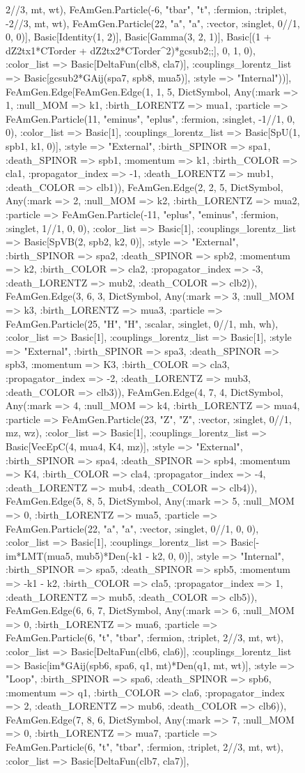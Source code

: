 \documentclass{revtex4}
\begin{document}
\begin{figure}[!htb]
\begin{center}
{2//3, mt, wt), FeAmGen.Particle(-6, "tbar", "t", :fermion, :triplet, -2//3, mt, wt), FeAmGen.Particle(22, "a", "a", :vector, :singlet, 0//1, 0, 0)], Basic[Identity(1, 2)], Basic[Gamma(3, 2, 1)], Basic[(1 + dZ2tx1*CTorder + dZ2tx2*CTorder^2)*gcsub2;;], 0, 1, 0), :color_list => Basic[DeltaFun(clb8, cla7)], :couplings_lorentz_list => Basic[gcsub2*GAij(spa7, spb8, mua5)], :style => "Internal"))], FeAmGen.Edge[FeAmGen.Edge(1, 1, 5, Dict{Symbol, Any}(:mark => 1, :null_MOM => k1, :birth_LORENTZ => mua1, :particle => FeAmGen.Particle(11, "eminus", "eplus", :fermion, :singlet, -1//1, 0, 0), :color_list => Basic[1], :couplings_lorentz_list => Basic[SpU(1, spb1, k1, 0)], :style => "External", :birth_SPINOR => spa1, :death_SPINOR => spb1, :momentum => k1, :birth_COLOR => cla1, :propagator_index => -1, :death_LORENTZ => mub1, :death_COLOR => clb1)), FeAmGen.Edge(2, 2, 5, Dict{Symbol, Any}(:mark => 2, :null_MOM => k2, :birth_LORENTZ => mua2, :particle => FeAmGen.Particle(-11, "eplus", "eminus", :fermion, :singlet, 1//1, 0, 0), :color_list => Basic[1], :couplings_lorentz_list => Basic[SpVB(2, spb2, k2, 0)], :style => "External", :birth_SPINOR => spa2, :death_SPINOR => spb2, :momentum => k2, :birth_COLOR => cla2, :propagator_index => -3, :death_LORENTZ => mub2, :death_COLOR => clb2)), FeAmGen.Edge(3, 6, 3, Dict{Symbol, Any}(:mark => 3, :null_MOM => k3, :birth_LORENTZ => mua3, :particle => FeAmGen.Particle(25, "H", "H", :scalar, :singlet, 0//1, mh, wh), :color_list => Basic[1], :couplings_lorentz_list => Basic[1], :style => "External", :birth_SPINOR => spa3, :death_SPINOR => spb3, :momentum => K3, :birth_COLOR => cla3, :propagator_index => -2, :death_LORENTZ => mub3, :death_COLOR => clb3)), FeAmGen.Edge(4, 7, 4, Dict{Symbol, Any}(:mark => 4, :null_MOM => k4, :birth_LORENTZ => mua4, :particle => FeAmGen.Particle(23, "Z", "Z", :vector, :singlet, 0//1, mz, wz), :color_list => Basic[1], :couplings_lorentz_list => Basic[VecEpC(4, mua4, K4, mz)], :style => "External", :birth_SPINOR => spa4, :death_SPINOR => spb4, :momentum => K4, :birth_COLOR => cla4, :propagator_index => -4, :death_LORENTZ => mub4, :death_COLOR => clb4)), FeAmGen.Edge(5, 8, 5, Dict{Symbol, Any}(:mark => 5, :null_MOM => 0, :birth_LORENTZ => mua5, :particle => FeAmGen.Particle(22, "a", "a", :vector, :singlet, 0//1, 0, 0), :color_list => Basic[1], :couplings_lorentz_list => Basic[-im*LMT(mua5, mub5)*Den(-k1 - k2, 0, 0)], :style => "Internal", :birth_SPINOR => spa5, :death_SPINOR => spb5, :momentum => -k1 - k2, :birth_COLOR => cla5, :propagator_index => 1, :death_LORENTZ => mub5, :death_COLOR => clb5)), FeAmGen.Edge(6, 6, 7, Dict{Symbol, Any}(:mark => 6, :null_MOM => 0, :birth_LORENTZ => mua6, :particle => FeAmGen.Particle(6, "t", "tbar", :fermion, :triplet, 2//3, mt, wt), :color_list => Basic[DeltaFun(clb6, cla6)], :couplings_lorentz_list => Basic[im*GAij(spb6, spa6, q1, mt)*Den(q1, mt, wt)], :style => "Loop", :birth_SPINOR => spa6, :death_SPINOR => spb6, :momentum => q1, :birth_COLOR => cla6, :propagator_index => 2, :death_LORENTZ => mub6, :death_COLOR => clb6)), FeAmGen.Edge(7, 8, 6, Dict{Symbol, Any}(:mark => 7, :null_MOM => 0, :birth_LORENTZ => mua7, :particle => FeAmGen.Particle(6, "t", "tbar", :fermion, :triplet, 2//3, mt, wt), :color_list => Basic[DeltaFun(clb7, cla7)], }
\end{center}
\end{figure}
\end{document}
